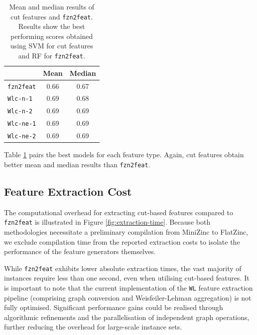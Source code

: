     \begin{table}[t]
      \centering
      \begin{tabular}{lcc}
        \toprule
        & Mean & Median \\
        \midrule
        \texttt{fzn2feat} &0.66 & 0.67  \\

        \texttt{Wlc-n-1} & 0.69 & 0.68 \\
        \texttt{Wlc-n-2} & 0.69 & 0.69 \\

        \texttt{Wlc-ne-1} & 0.69 & 0.69 \\
        \texttt{Wlc-ne-2} & 0.69 & 0.69 \\
        \bottomrule
      \end{tabular}
      \caption{Mean and median results of cut features and \texttt{fzn2feat}. Results show the best performing scores obtained using SVM for cut features and RF for \texttt{fzn2feat}.}
      \label{tab:summary-accuracy-results}
    \end{table}


    Table \ref{tab:summary-accuracy-results} pairs the best models for each feature type. Again, cut features obtain better mean and median results than \texttt{fzn2feat}.

    \subsection{Feature Extraction Cost}\label{sec:extraction-cost}
    The computational overhead for extracting cut-based features compared to \texttt{fzn2feat} is illustrated in Figure \ref{fig:extraction-time}. Because both methodologies necessitate a preliminary compilation from MiniZinc to FlatZinc, we exclude compilation time from the reported extraction costs to isolate the performance of the feature generators themselves.

    While \texttt{fzn2feat} exhibits lower absolute extraction times, the vast majority of instances require less than one second, even when utilising cut-based features. It is important to note that the current implementation of the \texttt{WL} feature extraction pipeline (comprising graph conversion and Weisfeiler-Lehman aggregation) is not fully optimised. Significant performance gains could be realised through algorithmic refinements and the parallelisation of independent graph operations, further reducing the overhead for large-scale instance sets.

